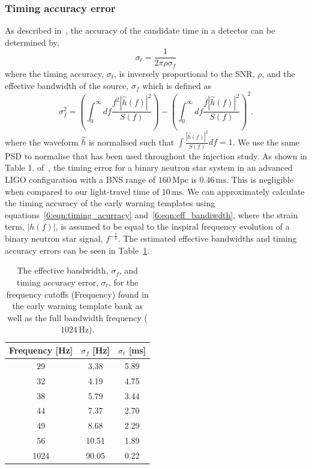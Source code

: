 \subsubsection{\label{6:sec:timing_error}Timing accuracy error}

As described in~\cite{Fairhurst:2010}, the accuracy of the candidate time in a detector can be determined by,
%
\begin{equation}
    \sigma_{t} = \frac{1}{2\pi\rho\sigma_{f}}
    \label{6:eqn:timing_acurracy}
\end{equation}
%
where the timing accuracy, $\sigma_{t}$, is inversely proportional to the SNR, $\rho$, and the effective bandwidth of the source, $\sigma_{f}$ which is defined as
%
\begin{equation}
    \sigma_{f}^2 = \left(\int^{\infty}_{0} df \frac{f^{2}|\hat{h}(f)|^{2}}{S(f)}\right) - \left( \int^{\infty}_{0} df \frac{f|\hat{h}(f)|^{2}}{S(f)}\right)^{2} .
    \label{6:eqn:eff_bandiwdth}
\end{equation}
%
where the waveform $\hat{h}$ is normalised such that $\int \frac{|\hat{h}(f)|^{2}}{S(f)}df = 1$. We use the same PSD to normalise that has been used throughout the injection study. As shown in Table 1. of~\cite{Fairhurst:2010}, the timing error for a binary neutron star system in an advanced LIGO configuration with a BNS range of $160 \, \text{Mpc}$ is $0.46 \, \text{ms}$. This is negligible when compared to our light-travel time of $10 \, \text{ms}$. We can approximately calculate the timing accuracy of the early warning templates using equations~\ref{6:eqn:timing_acurracy} and~\ref{6:eqn:eff_bandiwdth}, where the \gwadj strain term, $|h(f)|$, is assumed to be equal to the inspiral frequency evolution of a binary neutron star signal, $f^{-\frac{7}{6}}$. The estimated effective bandwidths and timing accuracy errors can be seen in Table~\ref{6:tab:timing_errors}.
%
\begin{table}[ht]
    \centering
    \setlength{\tabcolsep}{4pt}
    \begin{tabular}{ccc}
        \toprule
        \textbf{Frequency [Hz]} & $\sigma_{f}$ [Hz] & $\sigma_{t}$ [ms] \\
        \midrule
        29 & 3.38 & 5.89 \\
        32 & 4.19 & 4.75 \\
        38 & 5.79 & 3.44 \\
        44 & 7.37 & 2.70 \\
        49 & 8.68 & 2.29 \\
        56 & 10.51 & 1.89 \\
        1024 & 90.05 & 0.22 \\
        \bottomrule
    \end{tabular}
    \caption{The effective bandwidth, $\sigma_{f}$, and timing accuracy error, $\sigma_{t}$, for the frequency cutoffs (Frequency) found in the early warning template bank as well as the full bandwidth frequency ($1024 \, \text{Hz}$).}
    \label{6:tab:timing_errors}
\end{table}
